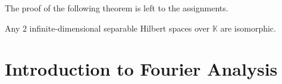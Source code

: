 \documentclass[notoc,notitlepage]{tufte-book}
\begin{document}
The proof of the following theorem is left to the assignments.

\begin{thm}\label{thm:isomorphism_of_infinite_dimensional_separable_hilbert_spaces}
  Any 2 infinite-dimensional separable Hilbert spaces over $\mathbb{K}$
  are isomorphic.
\end{thm}


\section{Introduction to Fourier Analysis}%
\label{sec:introduction_to_fourier_analysis}
\end{document}
